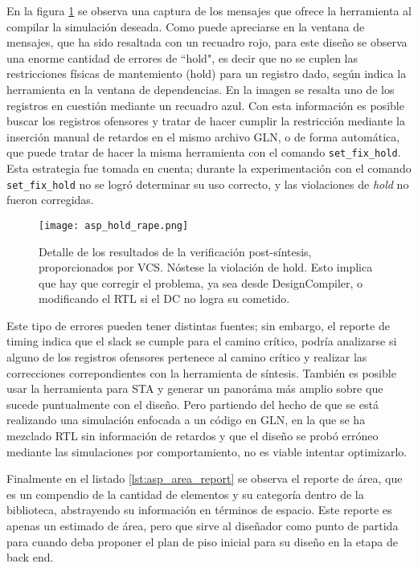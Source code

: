 En la figura \ref{fig_asp_hold} se observa una captura de los mensajes que ofrece la herramienta al compilar la simulación deseada. Como puede apreciarse en la ventana de mensajes, que ha sido resaltada con un recuadro rojo, para este diseño se observa una enorme cantidad de errores de ``hold", es decir que no se cuplen las restricciones físicas de mantemiento (hold) para un registro dado, según indica la herramienta en la ventana de dependencias. En la imagen se resalta uno de los registros en cuestión mediante un recuadro azul. Con esta información es posible buscar los registros ofensores y tratar de hacer cumplir la restricción mediante la inserción manual de retardos en el mismo archivo GLN, o de forma automática, que puede tratar de hacer la misma herramienta con el comando \texttt{set\_fix\_hold}. Esta estrategia fue tomada en cuenta; durante la experimentación con el comando \texttt{set\_fix\_hold} no se logró determinar su uso correcto, y las violaciones de \textit{hold} no fueron corregidas.

\begin{figure}[h]
\texttt{[image: asp\_hold\_rape.png]}
\caption{Detalle de los resultados de la verificación post-síntesis, proporcionados por VCS. Nóstese la violación de hold. Esto implica que hay que corregir el problema, ya sea desde DesignCompiler, o modificando el RTL si el DC no logra su cometido.}
\label{fig_asp_hold}
\end{figure}

Este tipo de errores pueden tener distintas fuentes; sin embargo, el reporte de timing indica que el slack se cumple para el camino crítico, podría analizarse si alguno de los registros ofensores pertenece al camino crítico y realizar las correcciones correpondientes con la herramienta de síntesis. También es posible usar la herramienta para STA y generar un panoráma más amplio sobre que sucede puntualmente con el diseño. Pero partiendo del hecho de que se está realizando una simulación enfocada a un código en GLN, en la que se ha mezclado RTL sin información de retardos y que el diseño se probó erróneo mediante las simulaciones por comportamiento, no es viable intentar optimizarlo.

Finalmente en el listado \ref{lst:asp_area_report} se observa el reporte de área, que es un compendio de la cantidad de elementos y su categoría dentro de la biblioteca, abstrayendo su información en términos de espacio. Este reporte es apenas un estimado de área, pero que sirve al diseñador como punto de partida para cuando deba proponer el plan de piso inicial para su diseño en la etapa de back end. 

